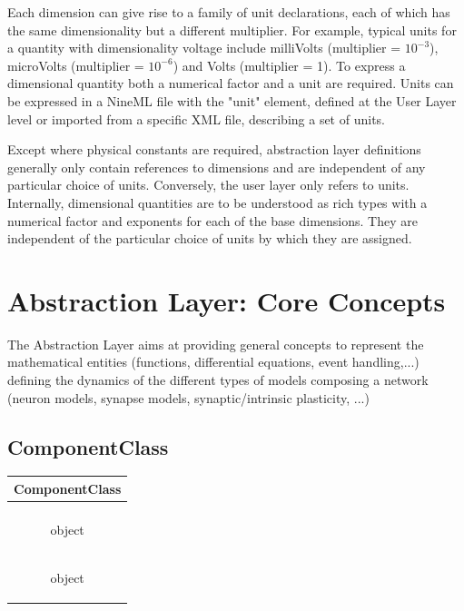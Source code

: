 \documentclass{article}
\begin{document}
Each dimension can give rise to a family of unit declarations, each of
which has the same dimensionality but a different multiplier. For example,
typical units for a quantity with dimensionality voltage include
milliVolts (multiplier = $10^{-3}$), microVolts (multiplier = $10^{-6}$)
and Volts (multiplier = 1).  To express a dimensional quantity both a
numerical factor and a unit are required. Units can be expressed in a NineML
file with the "unit" element, defined at the User Layer level or imported
from a specific XML file, describing a set of units.

Except where physical constants are required, abstraction layer definitions
generally only contain references to dimensions and are independent of any
particular choice of units. Conversely, the user layer only refers to units.
Internally, dimensional quantities are to be understood
as rich types with a numerical factor and exponents for each of the
base dimensions. They are independent of the particular choice of
units by which they are assigned.

\section{Abstraction Layer: Core Concepts }
\label{AbstractionL}

The Abstraction Layer aims at providing general concepts to represent the
mathematical entities (functions, differential equations, event handling,...)
defining the dynamics of the different types of models composing a network
(neuron models, synapse models, synaptic/intrinsic
plasticity, ...)

\subsection{ComponentClass}


\begin{table}[htb]
\center
\begin{tabular}{|c|}
\hline
\hline
ComponentClass \\
\hline \\
\colorbox{issuecolor}{\parbox{0.4\linewidth}
{ object}} \\
\hline
\colorbox{issuecolor}{\parbox{0.4\linewidth}
{ object}} \\
\hline
\end{tabular}
\end{table}
\end{document}
